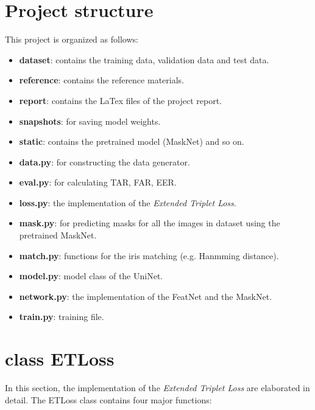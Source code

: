 \documentclass{article}
\begin{document}
\section{Project structure}
This project is organized as follows:
\begin{itemize}
	\item \textbf{dataset}: contains the training data, validation data and test data. 
	\item \textbf{reference}: contains the reference materials.
	\item \textbf{report}: contains the LaTex files of the project report.
	\item \textbf{snapshots}: for saving model weights.
	\item \textbf{static}: contains the pretrained model (MaskNet) and so on.
	\item \textbf{data.py}: for constructing the data generator.
	\item \textbf{eval.py}: for calculating TAR, FAR, EER.
	\item \textbf{loss.py}: the implementation of the \textit{Extended Triplet Loss}.
	\item \textbf{mask.py}: for predicting masks for all the images in dataset using the pretrained MaskNet.
	\item \textbf{match.py}: functions for the iris matching (e.g. Hanmming distance).
	\item \textbf{model.py}: model class of the UniNet.
	\item \textbf{network.py}: the implementation of the FeatNet and the MaskNet.
	\item \textbf{train.py}: training file.
\end{itemize}

\section{class ETLoss}
In this section, the implementation of the \textit{Extended Triplet Loss} are elaborated in detail. The ETLoss class contains four major functions:
\end{document}
